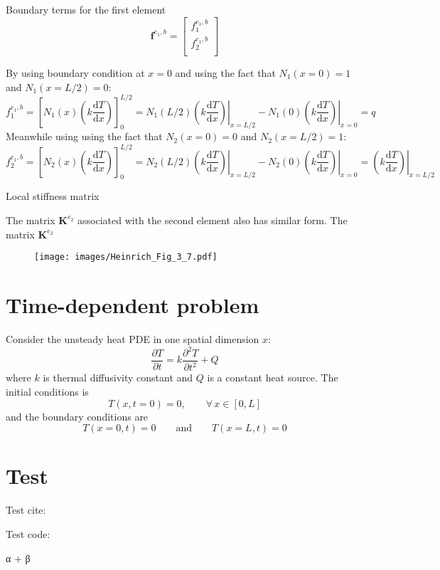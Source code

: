 \documentclass[a4paper,12pt]{article} %
\begin{document}
Boundary terms for the first element
\begin{equation}
\mathbf{f}^{e_{1},b} = \begin{bmatrix}
f^{e_{1},b}_{1} \\
f^{e_{1},b}_{2} \\
\end{bmatrix}
\end{equation}

By using boundary condition at $x=0$ and using the fact that $N_{1}(x=0)=1$
and $N_{1}(x=L/2)=0$:
\begin{equation}
f^{e_{1},b}_{1} = \left[ N_{1}(x) \left( k\frac{\mathrm{d}T}{\mathrm{d}x} \right) \right]_{0}^{L/2} =
N_{1}(L/2) \left. \left( k\frac{\mathrm{d}T}{\mathrm{d}x} \right)\right|_{x=L/2} -
N_{1}(0) \left. \left( k\frac{\mathrm{d}T}{\mathrm{d}x} \right)\right|_{x=0} = q
\end{equation}
Meanwhile using using the fact that $N_{2}(x=0)=0$
and $N_{2}(x=L/2)=1$:
\begin{equation}
f^{e_{1},b}_{2} = \left[ N_{2}(x) \left( k\frac{\mathrm{d}T}{\mathrm{d}x} \right) \right]_{0}^{L/2} =
N_{2}(L/2) \left. \left( k\frac{\mathrm{d}T}{\mathrm{d}x} \right)\right|_{x=L/2} -
N_{2}(0) \left. \left( k\frac{\mathrm{d}T}{\mathrm{d}x} \right)\right|_{x=0} =
\left. \left( k\frac{\mathrm{d}T}{\mathrm{d}x} \right)\right|_{x=L/2}
\end{equation}

Local stiffness matrix

The matrix $\mathbf{K}^{e_{2}}$ associated with the second element also has similar
form. The matrix $\mathbf{K}^{e_{2}}$

\begin{figure}[H]
{\centering
\texttt{[image: images/Heinrich\_Fig\_3\_7.pdf]}
\par}
\end{figure}


\section{Time-dependent problem}

Consider the unsteady heat PDE in one spatial dimension $x$:
\begin{equation}
\frac{\partial T}{\partial t} = k \frac{\partial^2 T}{\partial t^2} + Q
\end{equation}
where $k$ is thermal diffusivity constant and $Q$ is a constant heat source.
%
The initial conditions is
\begin{equation}
T(x,t=0) = 0,\qquad \forall \, x \in [0,L]
\end{equation}
and the boundary conditions are
\begin{equation}
T(x=0,t) = 0 \qquad \text{and} \qquad T(x=L,t) = 0
\end{equation}


\section{Test}

Test cite: \cite{Heinrich2017}

Test code:
\begin{juliacode}
α + β
\end{juliacode}



\end{document}
